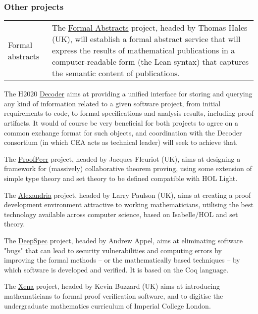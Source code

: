 \subsubsection*{Other projects}

\begin{longtable}{|p{}|p{}|}
\hline
Formal abstracts & 
The \href{https://formalabstracts.github.io/}{Formal Abstracts}
project, headed by Thomas Hales (UK), will establish a formal abstract
service that will express the results of mathematical publications in
a computer-readable form (the Lean syntax) that captures the semantic
content of publications.
\\

\end{longtable}


The H2020 \href{https://www.decoder-project.eu}{Decoder} aims at
providing a unified interface for storing and querying any kind of
information related to a given software project, from initial
requirements to code, to formal specifications and analysis results,
including proof artifacts. It would of course be very beneficial for
both projects to agree on a common exchange format for such objects, and
coordination with the Decoder consortium (in which CEA acts as technical
leader) will seek to achieve that.


The \href{http://www.proofpeer.net/}{ProofPeer} project, headed by
Jacques Fleuriot (UK), aims at designing a framework for (massively)
collaborative theorem proving, using some extension of simple type
theory and set theory to be defined compatible with HOL Light.

The
\href{https://www.cl.cam.ac.uk/~lp15/Grants/Alexandria/}{Alexandria}
project, headed by Larry Paulson (UK), aims at creating a proof
development environment attractive to working mathematicians,
utilising the best technology available across computer science, based
on Isabelle/HOL and set theory.

The \href{https://deepspec.org/}{DeepSpec} project, headed by Andrew
Appel, aims at eliminating software "bugs" that can lead to security
vulnerabilities and computing errors by improving the formal methods
-- or the mathematically based techniques -- by which software is
developed and verified. It is based on the Coq language.

The \href{https://xenaproject.wordpress.com/}{Xena} project, headed by
Kevin Buzzard (UK) aims at introducing mathematicians to formal proof
verification software, and to digitise the undergraduate mathematics
curriculum of Imperial College London.


